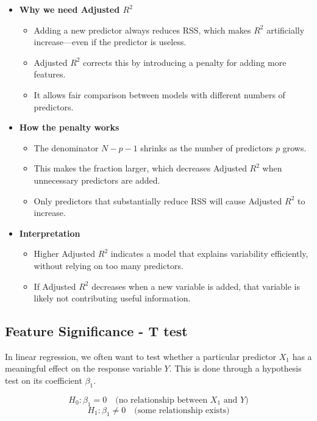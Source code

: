 \documentclass[10pt,a4paper]{article}
\begin{document}
	\begin{itemize}

		\item \textbf{Why we need Adjusted $R^2$}
		\begin{itemize}
			\item Adding a new predictor always reduces RSS, which makes $R^2$ artificially increase—even if the predictor is useless.
			\item Adjusted $R^2$ corrects this by introducing a penalty for adding more features.
			\item It allows fair comparison between models with different numbers of predictors.
		\end{itemize}

		\item \textbf{How the penalty works}
		\begin{itemize}
			\item The denominator $N - p - 1$ shrinks as the number of predictors $p$ grows.
			\item This makes the fraction larger, which decreases Adjusted $R^2$ when unnecessary predictors are added.
			\item Only predictors that substantially reduce RSS will cause Adjusted $R^2$ to increase.
		\end{itemize}

		\item \textbf{Interpretation}
		\begin{itemize}
			\item Higher Adjusted $R^2$ indicates a model that explains variability efficiently, without relying on too many predictors.
			\item If Adjusted $R^2$ decreases when a new variable is added, that variable is likely not contributing useful information.
		\end{itemize}

	\end{itemize}


	\subsection{Feature Significance - T test}

	In linear regression, we often want to test whether a particular predictor $X_1$ has a meaningful effect on the response variable $Y$.
	This is done through a hypothesis test on its coefficient $\beta_1$.

		\[
		H_0 : \beta_1 = 0 \quad \text{(no relationship between $X_1$ and $Y$)}
		\]
		\[
		H_1 : \beta_1 \ne 0 \quad \text{(some relationship exists)}
		\]
\end{document}
